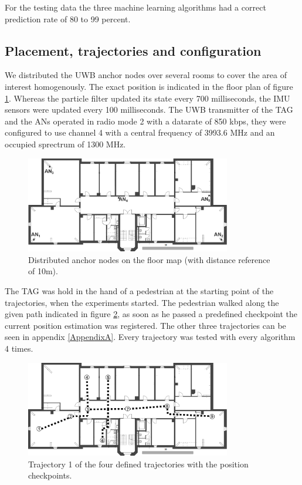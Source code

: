 For the testing data the three machine learning algorithms had a correct prediction rate of 80 to 99 percent. 

\subsection{Placement, trajectories and configuration}
We distributed the UWB anchor nodes over several rooms to cover the area of interest homogenously. The exact position is indicated in the floor plan of figure \ref{fig:anchor_position}. Whereas the particle filter updated its state every 700 milliseconds, the IMU sensors were updated every 100 milliseconds. The UWB transmitter of the TAG and the ANs operated in radio mode 2 with a datarate of 850 kbps, they were configured to use channel 4 with a central frequency of 3993.6 MHz and an occupied sprectrum of 1300 MHz.

\begin{figure}[th]
\centering
\includegraphics[width=0.8\textwidth]{Figures/anchor_position}
\decoRule
\caption[Anchor Node Positions]{Distributed anchor nodes on the floor map (with distance reference of 10m).}
\label{fig:anchor_position}
\end{figure}

The TAG was hold in the hand of a pedestrian at the starting point of the trajectories, when the experiments started. The pedestrian walked along the given path indicated in figure \ref{fig:trajectory1}, as soon as he passed a predefined checkpoint the current position estimation was registered. The other three trajectories can be seen in appendix \ref{AppendixA}. Every trajectory was tested with every algorithm 4 times.

\begin{figure}[th]
\centering
\includegraphics[width=0.8\textwidth]{Figures/trajectory1}
\decoRule
\caption[Trajectory 1]{Trajectory 1 of the four defined trajectories with the position checkpoints.}
\label{fig:trajectory1}
\end{figure}

